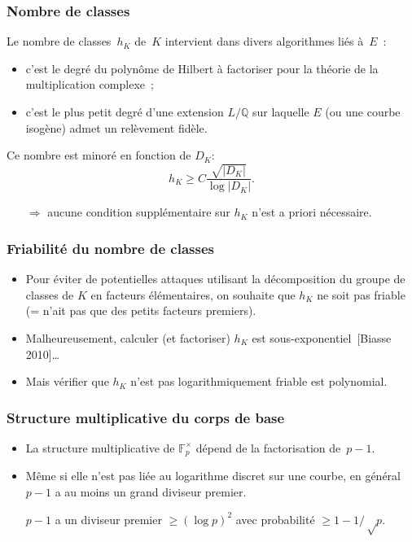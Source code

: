 \documentclass[francais]{beamer}
\newcommand{\abs}[1]{\left| #1 \right|}
\newcommand{\F}{\mathbb{F}}
\newcommand{\bib}[1]{{\usebeamercolor{emph}\textcolor{fg}{~[#1]}}}
\begin{document}
\begin{frame}\frametitle{Nombre de classes}
Le nombre de classes~$h_K$ de~$K$ intervient dans divers
algorithmes liés à~$E$ :
\begin{itemize}
\item c'est le degré du polynôme de Hilbert à factoriser pour la
théorie de la multiplication complexe ;
\item c'est le plus petit degré d'une extension $L/ℚ$
sur laquelle $E$ (ou une courbe isogène) admet un relèvement fidèle.
\end{itemize}
Ce nombre est minoré en fonction de $D_{K}$:
\[ h_K ≥ C \frac{\sqrt{\abs{D_K}}}{\log \abs{D_K}}. \]
\begin{itemize}
\item[$⇒$] aucune condition supplémentaire sur $h_K$ n'est a priori
nécessaire.
\end{itemize}
\end{frame}

\begin{frame}\frametitle{Friabilité du nombre de classes}
\begin{itemize}
\item Pour éviter de potentielles attaques utilisant la décomposition
du groupe de classes de $K$ en facteurs élémentaires, on souhaite que
$h_K$ ne soit pas friable (= n'ait pas que des petits facteurs premiers).
\bigskip
\item Malheureusement,
calculer (et factoriser) $h_K$ est sous-exponentiel\bib{Biasse
2010}\ldots
\item Mais vérifier que $h_K$ n'est pas logarithmiquement friable
est polynomial.
\end{itemize}
\end{frame}

\begin{frame}\frametitle{Structure multiplicative du corps de base}
\begin{itemize}
\item La structure multiplicative de $\F_p^{×}$ dépend
de la factorisation de~$p-1$.
\item Même si elle n'est pas liée au logarithme discret sur une courbe,
en général $p-1$ a au moins un grand diviseur premier.
\begin{block}{}
$p-1$ a un diviseur premier $≥ (\log p)^2$
avec probabilité $≥1-1/√p$.
\end{block}
\end{itemize}
\end{frame}
\end{document}
